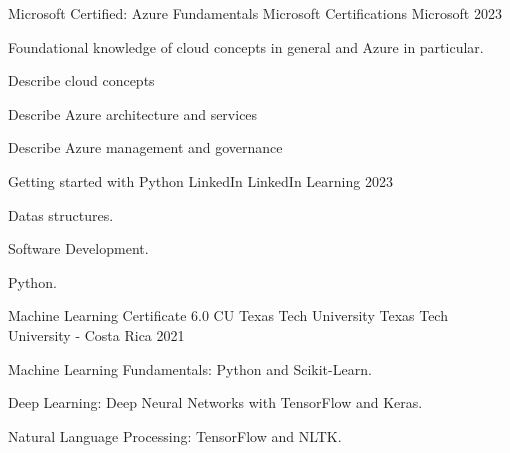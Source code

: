 

\begin{cventries}


  \cventry
  {Microsoft Certified: Azure Fundamentals} %
    {Microsoft Certifications} %
    {Microsoft} %
    {2023} %
    {
      \begin{cvitems} %
        \item Foundational knowledge of cloud concepts in general and Azure in
              particular.
        \item Describe cloud concepts
        \item Describe Azure architecture and services
        \item Describe Azure management and governance
      \end{cvitems}
    }
  \cventry
  {Getting started with Python} %
    {LinkedIn} %
    {LinkedIn Learning} %
    {2023} %
    {
      \begin{cvitems} %
        \item Datas structures.
        \item Software Development.
        \item Python.
      \end{cvitems}
    }
  \cventry
    {Machine Learning Certificate 6.0 CU} %
    {Texas Tech University} %
    {Texas Tech University - Costa Rica} %
    {2021} %
    {
      \begin{cvitems} %
        \item Machine Learning Fundamentals: Python and Scikit-Learn.
        \item Deep Learning: Deep Neural Networks with TensorFlow and Keras.
        \item Natural Language Processing: TensorFlow and NLTK.

\end{cvitems}}
\end{cventries}
